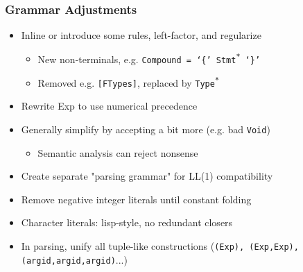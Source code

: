 \documentclass{article}
\begin{document}
\begin{frame}
    \frametitle{Grammar Adjustments}
    \begin{itemize}[<+(1)->]
        \item Inline or introduce some rules, left-factor, and regularize
            \begin{itemize}[<+(1)->]
                \item New non-terminals, e.g. \texttt{Compound = `\{'
                    Stmt\textsuperscript{*} `\}' }
                \item Removed e.g. \texttt{[FTypes]}, replaced by
                    \texttt{Type\textsuperscript{*}}
            \end{itemize}
        \item Rewrite Exp to use numerical precedence
        \item Generally simplify by accepting a bit more (e.g. bad
            \texttt{Void})
            \begin{itemize}[<+(1)->]
                \item Semantic analysis can reject nonsense
            \end{itemize}
        \item Create separate "parsing grammar" for LL(1) compatibility
        \item Remove negative integer literals until constant folding
        \item Character literals: lisp-style, no redundant closers
        \item In parsing, unify all tuple-like constructions (\texttt{(Exp),
            (Exp,Exp), (argid,argid,argid)}...)
    \end{itemize}
\end{frame}
\end{document}
